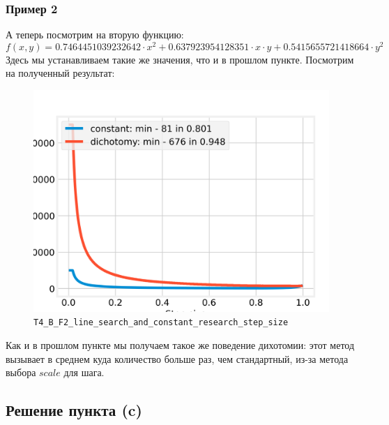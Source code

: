 \documentclass[12pt, a4paper, oneside, final]{article}
\begin{document}
	\subsubsection*{Пример 2}
	А теперь посмотрим на вторую функцию:
	\[
		f(x, y) = 0.7464451039232642 \cdot x^{2} + 0.637923954128351 \cdot x \cdot y + 0.5415655721418664 \cdot y^{2}
	\]
	Здесь мы устанавливаем такие же значения, что и в прошлом пункте. Посмотрим на полученный результат:
	\begin{figure}[H]
		\centering
		\includegraphics[scale=0.68]{Image/T4_B_F2_line_search_and_constant_research_step_size.png}
		\caption*{\texttt{T4\_B\_F2\_line\_search\_and\_constant\_research\_step\_size}}
	\end{figure}
	Как и в прошлом пункте мы получаем такое же поведение дихотомии: этот метод вызывает в среднем куда количество больше раз, чем стандартный, из-за метода выбора $scale$ для шага.
	\subsection*{Решение пункта (c)}
\end{document}
